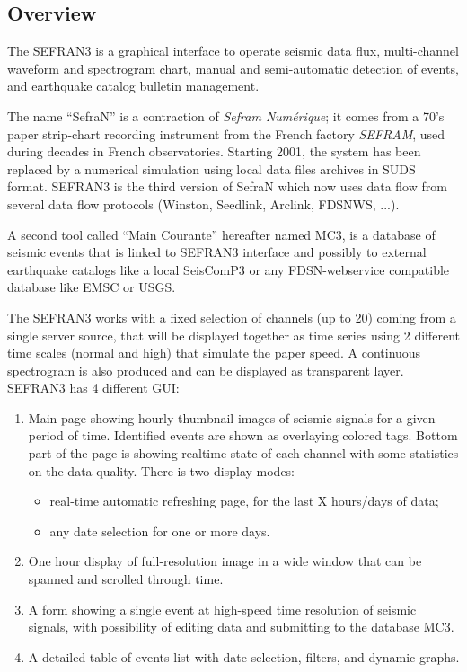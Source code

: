 \subsection{Overview}

The SEFRAN3 is a graphical interface to operate seismic data flux, multi-channel waveform and spectrogram chart, manual and semi-automatic detection of events, and earthquake catalog bulletin management.

The name ``SefraN'' is a contraction of \textit{Sefram Numérique}; it comes from a 70's paper strip-chart recording instrument from the French factory \textit{SEFRAM\textregistered}, used during decades in French observatories. Starting 2001, the system has been replaced by a numerical simulation using local data files archives in SUDS format. SEFRAN3 is the third version of SefraN which now uses data flow from several data flow protocols (Winston, Seedlink, Arclink, FDSNWS, ...).

A second tool called ``Main Courante'' hereafter named MC3, is a database of seismic events that is linked to SEFRAN3 interface and possibly to external earthquake catalogs like a local SeisComP3 or any FDSN-webservice compatible database like EMSC or USGS.

The SEFRAN3 works with a fixed selection of channels (up to 20) coming from a single server source, that will be displayed together as time series using 2 different time scales (normal and high) that simulate the paper speed. A continuous spectrogram is also produced and can be displayed as transparent layer. SEFRAN3 has 4 different GUI:
\begin{enumerate}

\item Main page showing hourly thumbnail images of seismic signals for a given period of time. Identified events are shown as overlaying colored tags. Bottom part of the page is showing realtime state of each channel with some statistics on the data quality. There is two display modes:
\begin{itemize}
\item real-time automatic refreshing page, for the last X hours/days of data;
\item any date selection for one or more days.
\end{itemize}

\item One hour display of full-resolution image in a wide window that can be spanned and scrolled through time.

\item A form showing a single event at high-speed time resolution of seismic signals, with possibility of editing data and submitting to the database MC3.

\item A detailed table of events list with date selection, filters, and dynamic graphs.

\end{enumerate}

